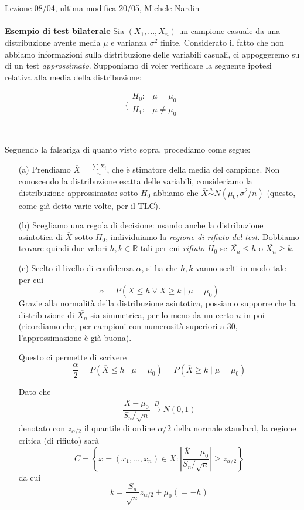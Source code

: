 \\ \\
Lezione 08/04, ultima modifica 20/05, Michele Nardin
\\ \\
\noindent \textbf{Esempio di test bilaterale}
Sia $(X_1,...,X_n)$ un campione casuale da una distribuzione avente media $\mu$ e varianza $\sigma^2$ finite. 
Considerato il fatto che non abbiamo informazioni sulla distribuzione delle variabili casuali, 
ci appoggeremo su di un test \textit{approssimato}.
Supponiamo di voler verificare la seguente ipotesi relativa alla media della distribuzione:

$$\bigg \{
\begin{array}{rl}
H_0: & \mu = \mu_0 \\
H_1: & \mu \neq \mu_0 \\
\end{array}
$$
\\ \\
Seguendo la falsariga di quanto visto sopra, procediamo come segue:

\begin{enumerate}
\item [(a)] Prendiamo $\overline{X}=\displaystyle \frac{\sum X_i}{n}$, che è stimatore della media del campione. Non conoscendo la distribuzione esatta delle variabili, consideriamo la distribuzione approssimata: sotto $H_0$ abbiamo che $\overline{X} \stackrel{a}{\sim} N(\mu_0,\sigma^2 / n) $ (questo, come già detto varie volte, per il TLC).

\item [(b)] Scegliamo una regola di decisione: usando anche la distribuzione asintotica di $\overline{X}$ sotto $H_0$, individuiamo la \textit{regione di rifiuto del test}. 
Dobbiamo trovare quindi due valori $h,k \in \mathbb{R}$ 
tali per cui \textit{rifiuto} $H_0$ se $\overline{X_n} \leq h$ o $\overline{X_n} \geq k$.

\item [(c)] Scelto il livello di confidenza $\alpha$, si ha che $h,k$ vanno scelti in modo tale per cui 
$$\alpha = P(\overline{X} \leq h \vee \overline{X} \geq k \mid \mu=\mu_0)$$
Grazie alla normalità della distribuzione asintotica, possiamo supporre che la distribuzione di $\overline{X_n}$ sia simmetrica, per lo meno da un certo $n$ in poi (ricordiamo che, per campioni con numerosità superiori a 30, l'approssimazione è già buona).

Questo ci permette di scrivere
$$\frac{\alpha}{2} = P(\overline{X} \leq h \mid \mu=\mu_0) = P(\overline{X} \geq k \mid \mu=\mu_0)$$

Dato che $$\frac{\overline{X} - \mu_0}{S_n / \sqrt{n}} \stackrel{D}{\to} N(0,1)$$
denotato con $z_{\alpha/2}$ il quantile di ordine $\alpha / 2$ della normale standard, la regione critica (di rifiuto) sarà
$$C=\left\{ \underline{x}=(x_1,...,x_n) \in X : \left| \frac{\overline{X} - \mu_0}{S_n / \sqrt{n}} \right| \geq z_{\alpha/2} \right\}$$
da cui $$k =  \frac{S_n}{\sqrt{n}}z_{\alpha/2} + \mu_0 (= -h )$$
\end{enumerate}


